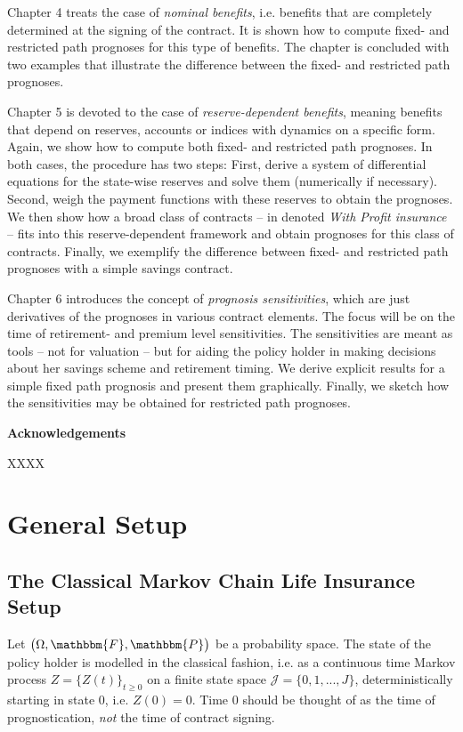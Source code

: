 \documentclass{article}
\newcommand{\1}[1]{\mathbbm{1}_{\left\lbrace #1 \right\rbrace}}
\theoremstyle{break}
\theoremstyle{remark}
\numberwithin{equation}{section}
\begin{document}
Chapter 4 treats the case of \textit{nominal benefits}, i.e. benefits that are completely determined at the signing of the contract. It is shown how to compute fixed- and restricted path prognoses for this type of benefits. The chapter is concluded with two examples that illustrate the difference between the fixed- and restricted path prognoses.

Chapter 5 is devoted to the case of \textit{reserve-dependent benefits}, meaning benefits that depend on reserves, accounts or indices with dynamics on a specific form. Again, we show how to compute both fixed- and restricted path prognoses. In both cases, the procedure has two steps: First, derive a system of differential equations for the state-wise reserves and solve them (numerically if necessary). Second, weigh the payment functions with these reserves to obtain the prognoses. We then show how a broad class of contracts -- in \cite{Liv2Bog} denoted \textit{With Profit insurance} -- fits into this reserve-dependent framework and obtain prognoses for this class of contracts. Finally, we exemplify the difference between fixed- and restricted path prognoses with a simple savings contract.

Chapter 6 introduces the concept of \textit{prognosis sensitivities}, which are just derivatives of the prognoses in various contract elements. The focus will be on the time of retirement- and premium level sensitivities. The sensitivities are meant as tools -- not for valuation -- but for aiding the policy holder in making decisions about her savings scheme and retirement timing. We derive explicit results for a simple fixed path prognosis and present them graphically. Finally, we sketch how the sensitivities may be obtained for restricted path prognoses.

\textbf{Acknowledgements}

XXXX

\newpage

\section{General Setup}

\subsection{The Classical Markov Chain Life Insurance Setup}

Let $\left( \Omega, \mathbbm{F}, \mathbbm{P} \right)$ be a probability space. The state of the policy holder is modelled in the classical fashion, i.e. as a continuous time Markov process $Z = \{ Z(t) \}_{t \geq 0}$ on a finite state space $\mathcal{J}= \{ 0, 1, ..., J \} $, deterministically starting in state $0$, i.e. $Z(0) = 0$. Time 0 should be thought of as the time of prognostication, \textit{not} the time of contract signing.
\end{document}
